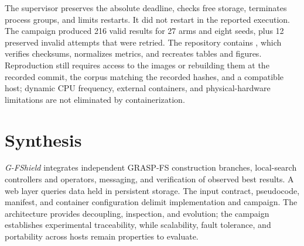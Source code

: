 The supervisor preserves the absolute deadline, checks free storage, terminates process groups, and limits restarts. It did not restart in the reported execution. The campaign produced 216 valid results for 27 arms and eight seeds, plus 12 preserved invalid attempts that were retried. The repository contains , which verifies checksums, normalizes metrics, and recreates tables and figures. Reproduction still requires access to the images or rebuilding them at the recorded commit, the corpus matching the recorded hashes, and a compatible host; dynamic CPU frequency, external containers, and physical-hardware limitations are not eliminated by containerization.

\section{Synthesis}

\textit{G-FShield} integrates independent GRASP-FS construction branches, local-search controllers and operators, messaging, and verification of observed best results. A web layer queries data held in persistent storage. The input contract, pseudocode, manifest, and container configuration delimit implementation and campaign. The architecture provides decoupling, inspection, and evolution; the campaign establishes experimental traceability, while scalability, fault tolerance, and portability across hosts remain properties to evaluate.
